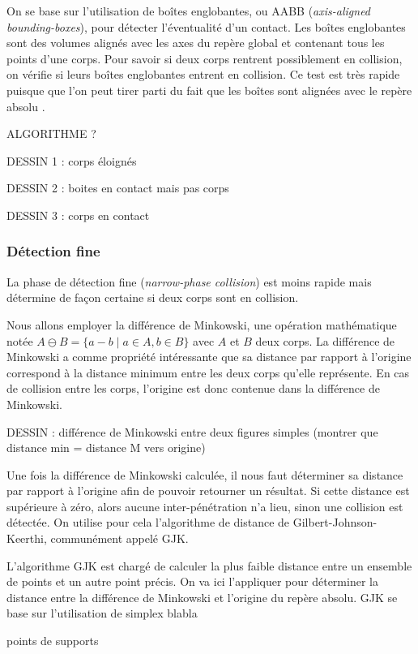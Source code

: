 On se base sur l'utilisation de boîtes englobantes, ou AABB (\textit{axis-aligned bounding-boxes}), pour détecter l'éventualité d'un contact. Les boîtes englobantes sont des volumes alignés avec les axes du repère global et contenant tous les points d'une corps. Pour savoir si deux corps rentrent possiblement en collision, on vérifie si leurs boîtes englobantes entrent en collision. Ce test est très rapide puisque que l'on peut tirer parti du fait que les boîtes sont alignées avec le repère absolu \cite{ericson05}.

ALGORITHME ?

DESSIN 1 : corps éloignés

DESSIN 2 : boites en contact mais pas corps

DESSIN 3 : corps en contact

\subsubsection{Détection fine}

La phase de détection fine (\textit{narrow-phase collision}) est moins rapide mais détermine de façon certaine si deux corps sont en collision.

Nous allons employer la différence de Minkowski, une opération mathématique notée $A \ominus B = \{a - b \mid a \in A, b \in B\}$ avec $A$ et $B$ deux corps. La différence de Minkowski a comme propriété intéressante que sa distance par rapport à l'origine correspond à la distance minimum entre les deux corps qu'elle représente. En cas de collision entre les corps, l'origine est donc contenue dans la différence de Minkowski.

DESSIN : différence de Minkowski entre deux figures simples (montrer que distance min = distance M vers origine)

Une fois la différence de Minkowski calculée, il nous faut déterminer sa distance par rapport à l'origine afin de pouvoir retourner un résultat. Si cette distance est supérieure à zéro, alors aucune inter-pénétration n'a lieu, sinon une collision est détectée. On utilise pour cela l'algorithme de distance de Gilbert-Johnson-Keerthi, communément appelé GJK.

L'algorithme GJK est chargé de calculer la plus faible distance entre un ensemble de points et un autre point précis. On va ici l'appliquer pour déterminer la distance entre la différence de Minkowski et l'origine du repère absolu. GJK se base sur l'utilisation de simplex blabla

points de supports


